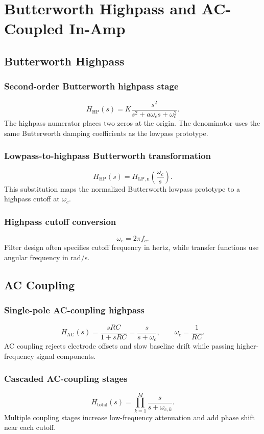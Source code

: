 \section{Butterworth Highpass and AC-Coupled In-Amp}

\subsection{Butterworth Highpass}

\subsubsection{Second-order Butterworth highpass stage}
\[
H_{\mathrm{HP}}(s)=K\frac{s^2}{s^2+a\omega_c s+\omega_c^2}.
\]
The highpass numerator places two zeros at the origin. The denominator uses the same Butterworth damping coefficients as the lowpass prototype.

\subsubsection{Lowpass-to-highpass Butterworth transformation}
\[
H_{\mathrm{HP}}(s)=H_{\mathrm{LP,n}}\!\left(\frac{\omega_c}{s}\right).
\]
This substitution maps the normalized Butterworth lowpass prototype to a highpass cutoff at \(\omega_c\).

\subsubsection{Highpass cutoff conversion}
\[
\omega_c=2\pi f_c.
\]
Filter design often specifies cutoff frequency in hertz, while transfer functions use angular frequency in rad/s.

\subsection{AC Coupling}

\subsubsection{Single-pole AC-coupling highpass}
\[
H_{\mathrm{AC}}(s)=\frac{sRC}{1+sRC}
=\frac{s}{s+\omega_c},\qquad \omega_c=\frac{1}{RC}.
\]
AC coupling rejects electrode offsets and slow baseline drift while passing higher-frequency signal components.

\subsubsection{Cascaded AC-coupling stages}
\[
H_{\mathrm{total}}(s)=\prod_{k=1}^{M}\frac{s}{s+\omega_{c,k}}.
\]
Multiple coupling stages increase low-frequency attenuation and add phase shift near each cutoff.


